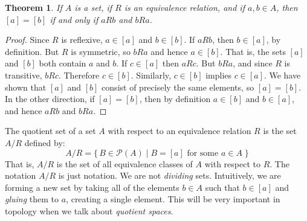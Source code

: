 \documentclass{article}
\theoremstyle{plain}
\newtheorem{theorem}{Theorem}[section]
\theoremstyle{normal}
\newenvironment{definition}{%
    \pushQED{\qed}\renewcommand{\qedsymbol}{$\blacksquare$}\definitionx%
}{%
    \popQED\enddefinitionx%
}
\begin{document}
        \begin{theorem}
            If $A$ is a set, if $R$ is an equivalence relation, and if
            $a,b\in{A}$, then $[a]=[b]$ if and only if $aRb$ and $bRa$.
        \end{theorem}
        \begin{proof}
            Since $R$ is reflexive, $a\in[a]$ and $b\in[b]$. If $aRb$,
            then $b\in[a]$, by definition. But $R$ is symmetric,
            so $bRa$ and hence $a\in[b]$. That is, the sets $[a]$ and $[b]$
            both contain $a$ and $b$. If $c\in[a]$ then $aRc$. But
            $bRa$, and since $R$ is transitive, $bRc$. Therefore
            $c\in[b]$. Similarly, $c\in[b]$ implies $c\in[a]$. We have shown
            that $[a]$ and $[b]$ consist of precisely the same elements, so
            $[a]=[b]$. In the other direction, if $[a]=[b]$, then by definition
            $a\in[b]$ and $b\in[a]$, and hence $aRb$ and $bRa$.
        \end{proof}
        \begin{definition}[\textbf{Quotient Set}]
            The quotient set of a set $A$ with respect to an equivalence
            relation $R$ is the set $A/R$ defined by:
            \begin{equation}
                A/R=\{\,B\in\mathcal{P}(A)\;|\;B=[a]\textrm{ for some }a\in{A}\;\}
            \end{equation}
            That is, $A/R$ is the set of all equivalence classes of $A$ with
            respect to $R$.
        \end{definition}
        The notation $A/R$ is just notation. We are not \textit{dividing} sets.
        Intuitively, we are forming a new set by taking all of the elements
        $b\in{A}$ such that $b\in[a]$ and \textit{gluing} them to $a$, creating
        a single element. This will be very important in topology when we talk
        about \textit{quotient spaces}.
\end{document}

